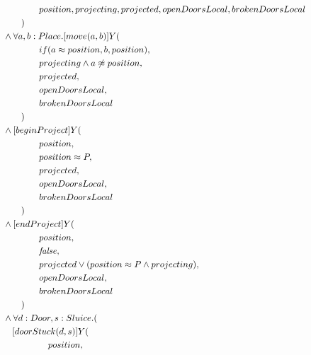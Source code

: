 \begin{description}
\begin{align*}
& \tab\tab\tab\tab\tab\tab\tab\tab\tab\tab position, projecting, projected, openDoorsLocal, brokenDoorsLocal \\
& \tab\tab\tab\tab\tab\tab\tab\tab ) \\
& \tab\tab\tab\tab\tab\tab  \wedge \forall a, b: Place . [move(a, b)]Y( \\
& \tab\tab\tab\tab\tab\tab\tab\tab\tab\tab if(a \approx position, b, position), \\
& \tab\tab\tab\tab\tab\tab\tab\tab\tab\tab projecting \wedge a \not\approx position, \\
& \tab\tab\tab\tab\tab\tab\tab\tab\tab\tab projected, \\
& \tab\tab\tab\tab\tab\tab\tab\tab\tab\tab openDoorsLocal, \\
& \tab\tab\tab\tab\tab\tab\tab\tab\tab\tab brokenDoorsLocal \\
& \tab\tab\tab\tab\tab\tab\tab\tab ) \\
& \tab\tab\tab\tab\tab\tab  \wedge [beginProject]Y( \\
& \tab\tab\tab\tab\tab\tab\tab\tab\tab\tab position, \\
& \tab\tab\tab\tab\tab\tab\tab\tab\tab\tab position \approx P, \\
& \tab\tab\tab\tab\tab\tab\tab\tab\tab\tab projected, \\
& \tab\tab\tab\tab\tab\tab\tab\tab\tab\tab openDoorsLocal, \\
& \tab\tab\tab\tab\tab\tab\tab\tab\tab\tab brokenDoorsLocal \\
& \tab\tab\tab\tab\tab\tab\tab\tab ) \\
& \tab\tab\tab\tab\tab\tab  \wedge [endProject]Y( \\
& \tab\tab\tab\tab\tab\tab\tab\tab\tab\tab position, \\
& \tab\tab\tab\tab\tab\tab\tab\tab\tab\tab \mathit{false}, \\
& \tab\tab\tab\tab\tab\tab\tab\tab\tab\tab projected \vee (position \approx P \wedge projecting), \\
& \tab\tab\tab\tab\tab\tab\tab\tab\tab\tab openDoorsLocal, \\
& \tab\tab\tab\tab\tab\tab\tab\tab\tab\tab brokenDoorsLocal \\
& \tab\tab\tab\tab\tab\tab\tab\tab ) \\
& \tab\tab\tab\tab\tab\tab  \wedge \forall d: Door, s: Sluice . ( \\ 
& \tab\tab\tab\tab\tab\tab\tab [doorStuck(d, s)]Y( \\
& \tab\tab\tab\tab\tab\tab\tab\tab\tab\tab\tab position, \\

\end{align*}
\end{description}
